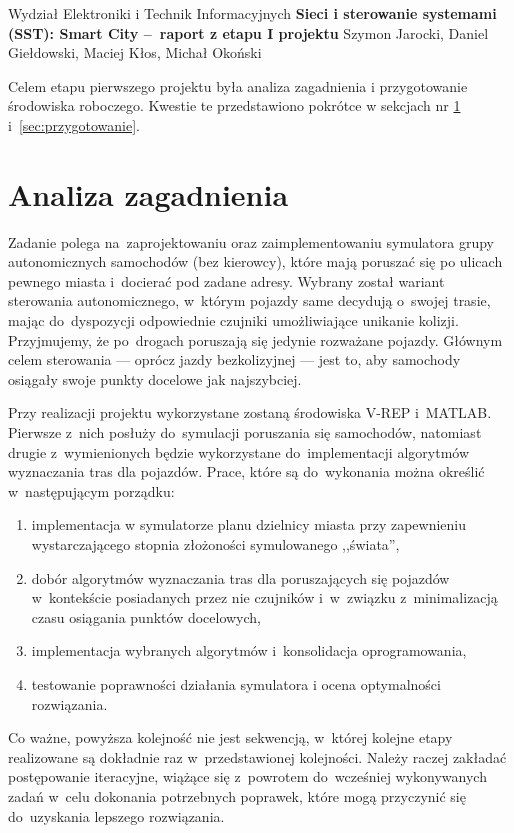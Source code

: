 \documentclass[11pt, a4paper, twoside]{article}
\begin{document}
\begin{center} 
	{\Large Wydział Elektroniki i Technik Informacyjnych}
	\vskip0.2cm
	{\LARGE \textbf{Sieci i sterowanie systemami (SST): Smart City --~raport z etapu I projektu  } } 
	\vskip0.3cm
	{\Large Szymon Jarocki, Daniel Giełdowski, Maciej Kłos, Michał Okoński}
	\vskip0.8cm
\end{center} 


Celem etapu pierwszego projektu była analiza zagadnienia i przygotowanie środowiska roboczego. Kwestie te przedstawiono pokrótce w sekcjach nr \ref{sec:analiza} i~\ref{sec:przygotowanie}.

\tableofcontents

\section{Analiza zagadnienia}
\label{sec:analiza}
Zadanie polega na~zaprojektowaniu oraz zaimplementowaniu symulatora grupy autonomicznych samochodów (bez kierowcy), które mają poruszać się po ulicach pewnego miasta i~docierać pod zadane adresy. Wybrany został wariant sterowania autonomicznego, w~którym pojazdy same decydują o~swojej trasie, mając do~dyspozycji odpowiednie czujniki umożliwiające unikanie kolizji. Przyjmujemy, że po~drogach poruszają się jedynie rozważane pojazdy. Głównym celem sterowania --- oprócz jazdy bezkolizyjnej --- jest to, aby samochody osiągały swoje punkty docelowe jak najszybciej.

Przy realizacji projektu wykorzystane zostaną środowiska V-REP i~MATLAB. Pierwsze z~nich posłuży do~symulacji poruszania się samochodów, natomiast drugie z~wymienionych będzie wykorzystane do~implementacji algorytmów wyznaczania tras dla pojazdów. Prace, które są do~wykonania można określić w~następującym porządku:
\begin{enumerate}[1)]
	\item implementacja w symulatorze planu dzielnicy miasta przy zapewnieniu wystarczającego stopnia złożoności symulowanego ,,świata'',
	\item dobór algorytmów wyznaczania tras dla poruszających się pojazdów w~kontekście posiadanych przez nie czujników i~w~związku z~minimalizacją czasu osiągania punktów docelowych,
	\item implementacja wybranych algorytmów i~konsolidacja oprogramowania,
	\item testowanie poprawności działania symulatora i ocena optymalności rozwiązania.
\end{enumerate}
Co ważne, powyższa kolejność nie jest sekwencją, w~której kolejne etapy realizowane są dokładnie raz w~przedstawionej kolejności. Należy raczej zakładać postępowanie iteracyjne, wiążące się z~powrotem do~wcześniej wykonywanych zadań w~celu dokonania potrzebnych poprawek, które mogą przyczynić się do~uzyskania lepszego rozwiązania.
\end{document}
